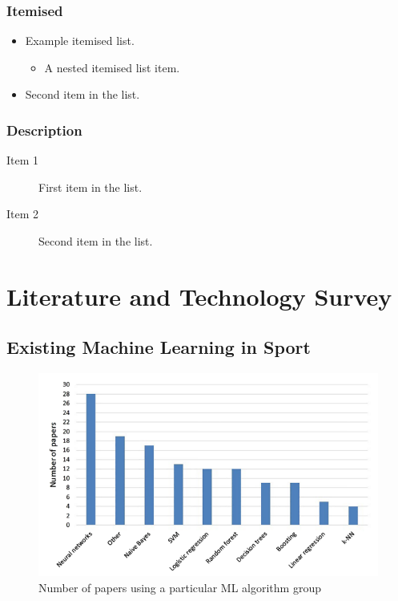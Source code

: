 \documentclass[12pt,a4paper]{report}
\begin{document}
\subsection{Itemised}

\begin{itemize}
\item Example itemised list.
  \begin{itemize}
  \item A nested itemised list item.
  \end{itemize}
\item Second item in the list.
\end{itemize}

\subsection{Description}

\begin{description}
\item[Item 1]First item in the list.
\item[Item 2]Second item in the list.
\end{description}


\chapter{Literature and Technology Survey}

\section{Existing Machine Learning in Sport}

\begin{figure}[H]
    \centering
    \includegraphics[width=\linewidth]{Horvat&Job_Figure2.png}
    \caption{Number of papers using a particular ML algorithm group \citep{horvat2020}}
    \label{fig:NoPapers}
\end{figure}
\end{document}
